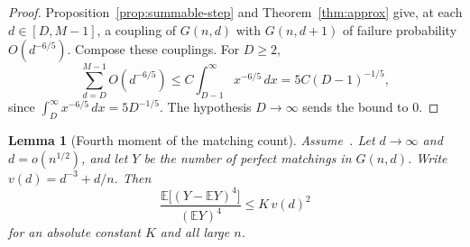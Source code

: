 \documentclass[11pt]{article}
\newtheorem{lemma}[theorem]{Lemma}
\newcommand{\Gnd}{G(n,d)}
\newcommand{\EE}{\mathbb{E}}
\begin{document}
\begin{proof}
Proposition~\ref{prop:summable-step} and Theorem~\ref{thm:approx} give, at each
\(d\in[D,M-1]\), a coupling of \(G(n,d)\) with \(G(n,d+1)\) of failure probability
\(O(d^{-6/5})\). Compose these couplings. For \(D\ge 2\),
\[
\sum_{d=D}^{M-1} O(d^{-6/5})
\le
C\int_{D-1}^{\infty} x^{-6/5}\,dx
=
5C(D-1)^{-1/5},
\]
since \(\int_D^\infty x^{-6/5}\,dx=5D^{-1/5}\). The hypothesis \(D\to\infty\) sends
the bound to \(0\).
\end{proof}

\begin{lemma}[Fourth moment of the matching count]
\label{lem:fourth-moment}
Assume~\cite[Theorem~6]{Gao20}. Let \(d\to\infty\) and \(d=o(n^{1/2})\), and let
\(Y\) be the number of perfect matchings in \(\Gnd\). Write
\(v(d)=d^{-3}+d/n\). Then
\[
\frac{\EE\bigl[(Y-\EE Y)^4\bigr]}{(\EE Y)^4}
\le
K\,v(d)^2
\]
for an absolute constant \(K\) and all large \(n\).
\end{lemma}
\end{document}
